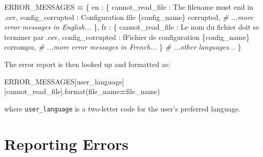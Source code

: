 \documentclass[
]{krantz}
\makeatletter
\newenvironment{Shaded}{\begin{snugshade}}{\end{snugshade}}
\newcommand{\BuiltInTok}[1]{#1}
\newcommand{\CommentTok}[1]{\textcolor[rgb]{0.56,0.35,0.01}{\textit{#1}}}
\newcommand{\NormalTok}[1]{#1}
\newcommand{\OperatorTok}[1]{\textcolor[rgb]{0.81,0.36,0.00}{\textbf{#1}}}
\newcommand{\SpecialCharTok}[1]{\textcolor[rgb]{0.00,0.00,0.00}{#1}}
\newcommand{\SpecialStringTok}[1]{\textcolor[rgb]{0.31,0.60,0.02}{#1}}
\newcommand{\StringTok}[1]{\textcolor[rgb]{0.31,0.60,0.02}{#1}}
\newenvironment{kframe}{%
\medskip{}
\setlength{\fboxsep}{.8em}
 \def\at@end@of@kframe{}%
 \ifinner\ifhmode%
  \def\at@end@of@kframe{\end{minipage}}%
  \begin{minipage}{\columnwidth}%
 \fi\fi%
 \def\FrameCommand##1{\hskip\@totalleftmargin \hskip-\fboxsep
 \colorbox{shadecolor}{##1}\hskip-\fboxsep
     \hskip-\linewidth \hskip-\@totalleftmargin \hskip\columnwidth}%
 \MakeFramed {\advance\hsize-\width
   \@totalleftmargin\z@ \linewidth\hsize
   \@setminipage}}%
 {\par\unskip\endMakeFramed%
 \at@end@of@kframe}
\renewenvironment{Shaded}{\begin{kframe}}{\end{kframe}}
\makeatother
\begin{document}
\begin{Shaded}
\begin{Highlighting}[]
\NormalTok{ERROR\_MESSAGES }\OperatorTok{=}\NormalTok{ \{}
    \StringTok{\textquotesingle{}en\textquotesingle{}}\NormalTok{ : \{}
        \StringTok{\textquotesingle{}cannot\_read\_file\textquotesingle{}}\NormalTok{ : }\StringTok{\textquotesingle{}The filename must end in \textasciigrave{}.csv\textasciigrave{}\textquotesingle{}}\NormalTok{,}
        \StringTok{\textquotesingle{}config\_corrupted\textquotesingle{}}\NormalTok{ : }\StringTok{\textquotesingle{}Configuration file }\SpecialCharTok{\{config\_name\}}\StringTok{ corrupted\textquotesingle{}}\NormalTok{,}
        \CommentTok{\# ...more error messages in English...}
\NormalTok{    \},}
    \StringTok{\textquotesingle{}fr\textquotesingle{}}\NormalTok{ : \{}
        \StringTok{\textquotesingle{}cannot\_read\_file\textquotesingle{}}\NormalTok{ : }\StringTok{\textquotesingle{}Le nom du fichier doit se terminer par \textasciigrave{}.csv\textasciigrave{}\textquotesingle{}}\NormalTok{,}
        \StringTok{\textquotesingle{}config\_corrupted\textquotesingle{}}\NormalTok{ : }\SpecialStringTok{f\textquotesingle{}Fichier de configuration }\SpecialCharTok{\{}\NormalTok{config\_name}\SpecialCharTok{\}}\SpecialStringTok{ corrompu\textquotesingle{}}\NormalTok{,}
        \CommentTok{\# ...more error messages in French...}
\NormalTok{    \}}
    \CommentTok{\# ...other languages...}
\NormalTok{\}}
\end{Highlighting}
\end{Shaded}

The error report is then looked up and formatted as:

\begin{Shaded}
\begin{Highlighting}[]
\NormalTok{ERROR\_MESSAGES[user\_language][}\StringTok{\textquotesingle{}cannot\_read\_file\textquotesingle{}}\NormalTok{].}\BuiltInTok{format}\NormalTok{(file\_name}\OperatorTok{=}\NormalTok{file\_name)}
\end{Highlighting}
\end{Shaded}

where \texttt{user\_language} is a two-letter code for the user's preferred language.

\hypertarget{errors-logging}{%
\section{Reporting Errors}\label{errors-logging}}
\end{document}
